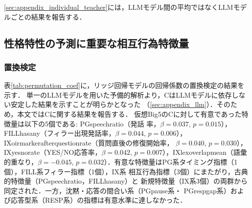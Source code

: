 \documentclass[dvipdfmx,11pt,a4paper]{bxjsarticle}
\renewcommand{\_}{\paperorigunderscore\allowbreak}%
\begin{document}
\ref{sec:appendix_individual_teacher}には，LLMモデル間の平均ではなくLLMモデルごとの結果を報告する．






\subsection{性格特性の予測に重要な相互行為特徴量}
\label{sec:xai_analysis}

\subsubsection{置換検定}
\label{sec:result_permutation_coef}


表\ref{tab:permutation_coef}に，リッジ回帰モデルの回帰係数の置換検定の結果を示す．
単一のLLMモデルを用いた予備的解析より，CはLLMモデルに依存しない安定した結果を示すことが明らかとなった
（\ref{sec:appendix_llm}）．そのため，本文ではCに関する結果を報告する．
仮想Big5のCに対して有意であった特徴量は以下の5個である: PG\_speech\_ratio（発話
率，$\beta = 0.037$, $p = 0.015$），FILL\_has\_any（フィラー出現発話率，$\beta =
0.044$, $p = 0.006$），IX\_oirmarker\_after\_question\_rate（質問直後の修復開始率，
$\beta = 0.040$, $p = 0.030$），IX\_yesno\_rate（YES/NO応答率，$\beta = 0.042$,
$p = 0.007$），IX\_lex\_overlap\_mean（語彙的重なり，$\beta = -0.045$, $p =
0.032$）．有意な特徴量はPG系タイミング指標（1個），FILL系フィラー指標（1個），IX系
相互行為指標（3個）にまたがり，古典的特徴量（PG\_speech\_ratio，FILL\_has\_any）と
新規特徴量（IX系3個）の両群から同定された．一方，沈黙・応答の間合い系（PG\_pause系・
PG\_resp\_gap系）および応答型系（RESP系）の指標は有意水準に達しなかった．



\begin{table}[htbp]
\centering
\caption{回帰係数に対する置換検定（Conscientiousness）．
各特徴量の回帰係数$\beta_{\text{obs}}$および$p$値を示す．$^{*}$は$p < 0.05$．}
\label{tab:permutation_coef}

\end{table}


\end{document}
